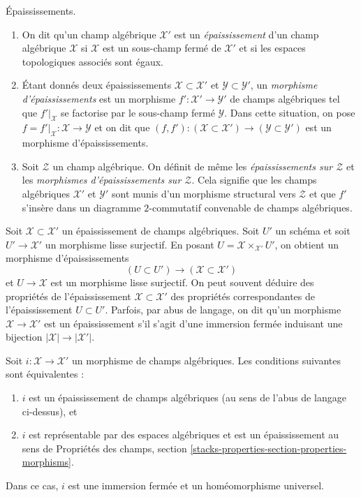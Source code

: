 \begin{definition}
\label{definition-thickening}
Épaississements.
\begin{enumerate}
\item On dit qu'un champ algébrique $\mathcal{X}'$ est un {\it épaississement}
d'un champ algébrique $\mathcal{X}$ si $\mathcal{X}$ est un sous-champ fermé
de $\mathcal{X}'$ et si les espaces topologiques associés sont égaux.
\item Étant donnés deux épaississements $\mathcal{X} \subset \mathcal{X}'$ et
$\mathcal{Y} \subset \mathcal{Y}'$, un {\it morphisme d'épaississements}
est un morphisme $f' : \mathcal{X}' \to \mathcal{Y}'$ de champs algébriques
tel que $f'|_\mathcal{X}$ se factorise par le
sous-champ fermé $\mathcal{Y}$. Dans cette situation, on pose
$f = f'|_\mathcal{X} : \mathcal{X} \to \mathcal{Y}$ et on dit que
$(f, f') : (\mathcal{X} \subset \mathcal{X}') \to
(\mathcal{Y} \subset \mathcal{Y}')$ est un morphisme d'épaississements.
\item Soit $\mathcal{Z}$ un champ algébrique. On définit de même les
{\it épaississements sur $\mathcal{Z}$} et les
{\it morphismes d'épaississements sur $\mathcal{Z}$}.
Cela signifie que les champs algébriques
$\mathcal{X}'$ et $\mathcal{Y}'$
sont munis d'un
morphisme structural vers $\mathcal{Z}$ et que $f'$ s'insère dans un
diagramme $2$-commutatif convenable de champs algébriques.
\end{enumerate}
\end{definition}

\noindent
Soit $\mathcal{X} \subset \mathcal{X}'$ un épaississement de champs algébriques.
Soit $U'$ un schéma et soit $U' \to \mathcal{X}'$ un morphisme lisse
surjectif. En posant $U = \mathcal{X} \times_{\mathcal{X}'} U'$, on obtient
un morphisme d'épaississements
$$
(U \subset U') \longrightarrow (\mathcal{X} \subset \mathcal{X}')
$$
et $U \to \mathcal{X}$ est un morphisme lisse surjectif. On peut souvent
déduire des propriétés de l'épaississement $\mathcal{X} \subset \mathcal{X}'$
des propriétés correspondantes de l'épaississement $U \subset U'$.
Parfois, par abus de langage, on dit qu'un morphisme
$\mathcal{X} \to \mathcal{X}'$ est un épaississement s'il s'agit d'une immersion
fermée induisant une bijection $|\mathcal{X}| \to |\mathcal{X}'|$.

\begin{lemma}
\label{lemma-thickening}
Soit $i : \mathcal{X} \to \mathcal{X}'$ un morphisme de champs algébriques.
Les conditions suivantes sont équivalentes :
\begin{enumerate}
\item $i$ est un épaississement de champs algébriques (au sens de l'abus de langage ci-dessus), et
\item $i$ est représentable par des espaces algébriques et
est un épaississement au sens de Propriétés des champs, section
\ref{stacks-properties-section-properties-morphisms}.
\end{enumerate}
Dans ce cas, $i$ est une immersion fermée et un homéomorphisme universel.
\end{lemma}

